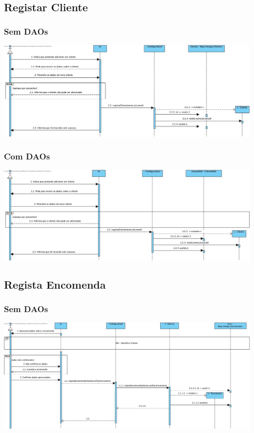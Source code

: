\subsection{Registar Cliente}
\subsubsection{Sem DAOs}
\begin{center}
 	\includegraphics[width = 5.5in]{DSI/DSI-Registar_Cliente.jpg}
\end{center}
\subsubsection{Com DAOs}
\begin{center}
 	\includegraphics[width = 5.5in]{DSI_D/DSI-DAOs-Registar_Cliente.jpg}
\end{center}

\subsection{Regista Encomenda}
\subsubsection{Sem DAOs}
\begin{center}
 	\includegraphics[width = 5.5in]{DSI/DSI-Registar_Encomenda.jpg}
\end{center}
